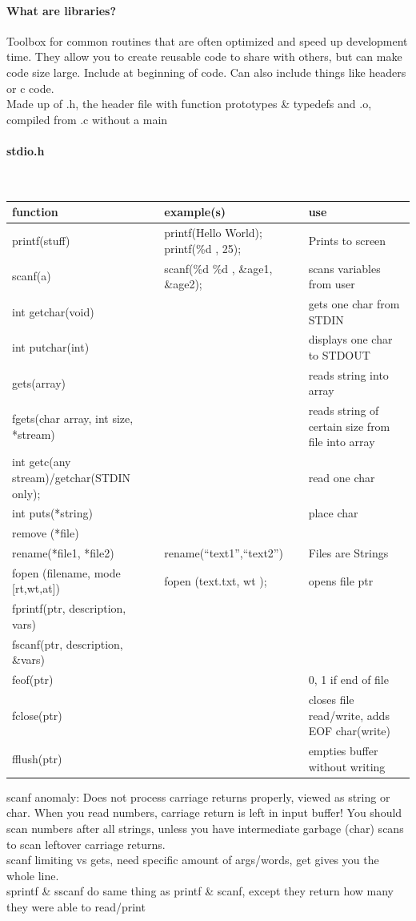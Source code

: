 \documentclass[12 pt]{article}
\begin{document}
\paragraph{What are libraries?} Toolbox for common routines that are often optimized and speed up development time. They allow you to create reusable code to share with others, but can make code size large. Include at beginning of code. Can also include things like headers or c code.
\\ Made up of .h, the header file with function prototypes \& typedefs and .o, compiled from .c without a main
\paragraph{stdio.h}~
\begin{tabularx}{\textwidth}{|X|X|X|}
	\hline \textbf{function} & \textbf{example(s)} & \textbf{use}
	\\\hline printf(\textquotedbl stuff\textquotedbl) & printf(\textquotedbl Hello World\textquotedbl); printf(\textquotedbl \%d \textquotedbl, 25); & Prints to screen
	\\\hline scanf(a) & scanf(\textquotedbl \%d \%d \textquotedbl, \&age1, \&age2); & scans variables from user
	\\\hline int getchar(void) & & gets one char from STDIN
	\\\hline int putchar(int) && displays one char to STDOUT
	\\\hline gets(array) && reads string into array
	\\\hline fgets(char array, int size, *stream) && reads string of certain size from file into array
	\\\hline int getc(any stream)/getchar(STDIN only); && read one char
	\\\hline int puts(*string) && place char
	\\\hline remove (*file) &&
	\\\hline rename(*file1, *file2) & rename(``text1'',``text2'')& Files are Strings
	\\\hline fopen (filename, mode [rt,wt,at]) & fopen (text.txt, \textquotedbl wt \textquotedbl); & opens file ptr
	\\\hline fprintf(ptr, description, vars) &&
	\\\hline fscanf(ptr, description, \&vars) &&
	\\\hline feof(ptr) && 0, 1 if end of file
	\\\hline fclose(ptr) && closes file read/write, adds EOF char(write)
	\\\hline fflush(ptr) && empties buffer without writing
	\\\hline
\end{tabularx}
scanf anomaly: Does not process carriage returns properly, viewed as string or char. When you read numbers, carriage return is left in input buffer! You should scan numbers after all strings, unless you have intermediate garbage (char) scans to scan leftover carriage returns.
\\scanf limiting vs gets, need specific amount of args/words, get gives you the whole line.
\\sprintf \& sscanf do same thing as printf \& scanf, except they return how many they were able to read/print
\end{document}
